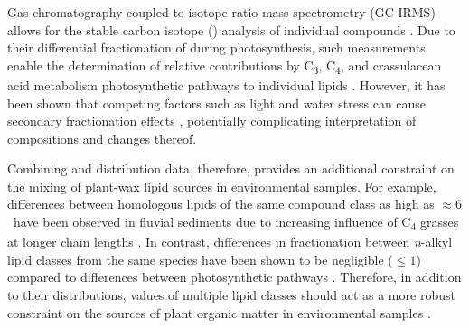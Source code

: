 Gas chromatography coupled to isotope ratio mass spectrometry (GC-IRMS) allows for the stable carbon isotope () analysis of individual compounds \citep{Hayes:1989us,Hayes:1993wa}. Due to their differential fractionation of  during photosynthesis, such measurements enable the determination of relative contributions by C\textsubscript{3}, C\textsubscript{4}, and crassulacean acid metabolism photosynthetic pathways to individual lipids \citep[][and references therein]{Collister:1994hb,Hobbie:2004iq}. However, it has been shown that competing factors such as light and water stress can cause secondary fractionation effects \citep[\textit{\textit{e.g.}}][]{Graham:2014hf}, potentially complicating interpretation of  compositions and changes thereof.

Combining  and distribution data, therefore, provides an additional constraint on the mixing of plant-wax lipid sources in environmental samples. For example,  differences between homologous lipids of the same compound class as high as $\approx6$\textperthousand\ have been observed in fluvial sediments due to increasing influence of C\textsubscript{4} grasses at longer chain lengths \citep{Freeman:2001tv,Galy:2011ix,Hoetzel:2013hj, Wang:2013jz,Agrawal:2014fl}. In contrast, differences in  fractionation between \textit{n}-alkyl lipid classes from the same species have been shown to be negligible ($\leq 1$\textperthousand) compared to differences between photosynthetic pathways \citep[$\approx13$\textperthousand][]{Chikaraishi:2007hj,Rommerskirchen:2006gr,Vogts:2009fb}. Therefore, in addition to their distributions,  values of multiple lipid classes should act as a more robust constraint on the sources of plant organic matter in environmental samples \citep[\textit{e.g.}][]{Chikaraishi:2006gb,Diefendorf:2011hg,Galy:2011ix,Feng:2013iv,Tao:2015bq}.


